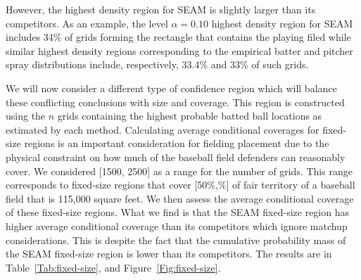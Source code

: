 \documentclass[12pt]{article}
\begin{document}
However, the highest density region for SEAM is slightly larger than its competitors. As an example, the level $\alpha = 0.10$ highest density region for SEAM includes 34\% of grids forming the rectangle that contains the playing filed while similar highest density regions corresponding to the empirical batter and pitcher spray distributions include, respectively, 33.4\% and 33\% of such grids. 

We will now consider a different type of confidence region which will balance these conflicting conclusions with size and coverage. This region is constructed using the $n$ grids containing the highest probable batted ball locations as estimated by each method. Calculating average conditional coverages for fixed-size regions is an important consideration for fielding placement due to the physical constraint on how much of the baseball field defenders can reasonably cover. We considered [1500, 2500] as a range for the number of grids. This range corresponds to fixed-size regions that cover [50\%,\%] of fair territory of a baseball field that is 115,000 square feet. 
We then assess the average conditional coverage of these fixed-size regions. What we find is that the SEAM fixed-size region has higher average conditional coverage than its competitors which ignore matchup considerations. This is despite the fact that the cumulative probability mass of the SEAM fixed-size region is lower than its competitors. The results are in Table~\ref{Tab:fixed-size}, and Figure~\ref{Fig:fixed-size}. 

\end{document}
